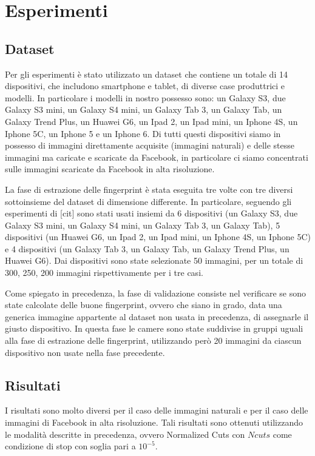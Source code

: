 \section{Esperimenti}

\subsection{Dataset}

Per gli esperimenti è stato utilizzato un dataset che contiene un totale di 14 dispositivi, che includono smartphone e tablet, di diverse case produttrici e modelli. In particolare i modelli in nostro possesso sono: un Galaxy S3, due Galaxy S3 mini, un Galaxy S4 mini, un Galaxy Tab 3, un Galaxy Tab, un Galaxy Trend Plus, un Huawei G6, un Ipad 2, un Ipad mini, un Iphone 4S, un Iphone 5C, un Iphone 5 e un Iphone 6. Di tutti questi dispositivi siamo in possesso di immagini direttamente acquisite (immagini naturali) e delle stesse immagini ma caricate e scaricate da Facebook, in particolare ci siamo concentrati sulle immagini scaricate da Facebook in alta risoluzione.

La fase di estrazione delle fingerprint è stata eseguita tre volte con tre diversi sottoinsieme del dataset di dimensione differente. In particolare, seguendo gli esperimenti di [cit] sono stati usati insiemi da 6 dispositivi (un Galaxy S3, due Galaxy S3 mini, un Galaxy S4 mini, un Galaxy Tab 3, un Galaxy Tab), 5 dispositivi (un Huawei G6, un Ipad 2, un Ipad mini, un Iphone 4S, un Iphone 5C) e 4 dispositivi (un Galaxy Tab 3, un Galaxy Tab, un Galaxy Trend Plus, un Huawei G6). Dai dispositivi sono state selezionate 50 immagini, per un totale di 300, 250, 200 immagini rispettivamente per i tre casi.

Come spiegato in precedenza, la fase di validazione consiste nel verificare se sono state calcolate delle buone fingerprint, ovvero che siano in grado, data una generica immagine appartente al dataset non usata in precedenza, di assegnarle il giusto dispositivo. In questa fase le camere sono state suddivise in gruppi uguali alla fase di estrazione delle fingerprint, utilizzando però 20 immagini da ciascun dispositivo non usate nella fase precedente.

\subsection{Risultati}

I risultati sono molto diversi per il caso delle immagini naturali e per il caso delle immagini di Facebook in alta risoluzione. Tali risultati sono ottenuti utilizzando le modalità descritte in precedenza, ovvero Normalized Cuts con $Ncuts$ come condizione di stop con soglia pari a $10^{-5}$.

